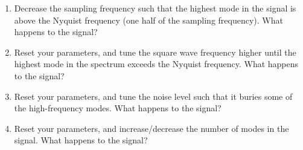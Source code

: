 \documentclass[12pt]{article}
\begin{document}
\begin{enumerate}
\item Decrease the sampling frequency such that the highest mode in the signal is above the Nyquist frequency (one half of the sampling frequency).  What happens to the signal?
\item Reset your parameters, and tune the square wave frequency higher until the highest mode in the spectrum exceeds the Nyquist frequency.  What happens to the signal?
\item Reset your parameters, and tune the noise level such that it buries some of the high-frequency modes.  What happens to the signal?
\item Reset your parameters, and increase/decrease the number of modes in the signal.  What happens to the signal?
\end{enumerate}
\end{document}
